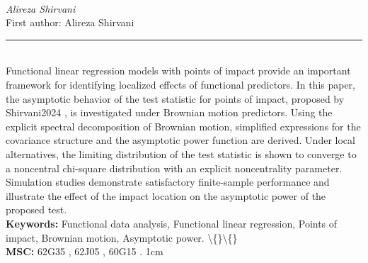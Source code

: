 \documentclass[10pt,twoside]{article}
\begin{document}
\noindent\begin{minipage}[t][\textheight]{\textwidth}
\\[0.35em]
{\itshape Alireza Shirvani}\\[0.2em]
{\footnotesize First author: Alireza Shirvani}\\[0.45em]
\noindent\rule{\textwidth}{0.3pt}\\[0.4em]
{\footnotesize  Functional linear regression models with points of impact provide an important framework for identifying localized effects of functional predictors. In this paper, the asymptotic behavior of the test statistic for points of impact, proposed by Shirvani2024 , is investigated under Brownian motion predictors. Using the explicit spectral decomposition of Brownian motion, simplified expressions for the covariance structure and the asymptotic power function are derived. Under local alternatives, the limiting distribution of the test statistic is shown to converge to a noncentral chi-square distribution with an explicit noncentrality parameter. Simulation studies demonstrate satisfactory finite-sample performance and illustrate the effect of the impact location on the asymptotic power of the proposed test.}\\[0.4em]
{\footnotesize\bfseries Keywords:} {\footnotesize Functional data analysis, Functional linear regression, Points of impact, Brownian motion, Asymptotic power. \textbackslash\{\}\textbackslash\{\}}\\[0.15em]
{\footnotesize\bfseries MSC:} {\footnotesize 62G35 , 62J05 , 60G15 . 1cm}\\
\vfill
\end{minipage}
\newpage
\end{document}
